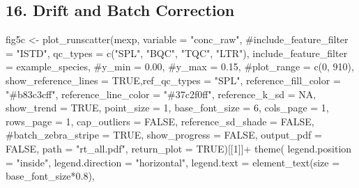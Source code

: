 \documentclass[
  letterpaper,
  DIV=11,
  numbers=noendperiod]{scrartcl}
\newenvironment{Shaded}{\begin{snugshade}}{\end{snugshade}}
\newcommand{\AttributeTok}[1]{\textcolor[rgb]{0.40,0.45,0.13}{#1}}
\newcommand{\CommentTok}[1]{\textcolor[rgb]{0.37,0.37,0.37}{#1}}
\newcommand{\ConstantTok}[1]{\textcolor[rgb]{0.56,0.35,0.01}{#1}}
\newcommand{\DecValTok}[1]{\textcolor[rgb]{0.68,0.00,0.00}{#1}}
\newcommand{\FloatTok}[1]{\textcolor[rgb]{0.68,0.00,0.00}{#1}}
\newcommand{\FunctionTok}[1]{\textcolor[rgb]{0.28,0.35,0.67}{#1}}
\newcommand{\NormalTok}[1]{\textcolor[rgb]{0.00,0.23,0.31}{#1}}
\newcommand{\OtherTok}[1]{\textcolor[rgb]{0.00,0.23,0.31}{#1}}
\newcommand{\SpecialCharTok}[1]{\textcolor[rgb]{0.37,0.37,0.37}{#1}}
\newcommand{\StringTok}[1]{\textcolor[rgb]{0.13,0.47,0.30}{#1}}
\begin{document}
\subsection{16. Drift and Batch
Correction}\label{drift-and-batch-correction-1}

\begin{Shaded}
\begin{Highlighting}[]
\NormalTok{fig5c }\OtherTok{\textless{}{-}} \FunctionTok{plot\_runscatter}\NormalTok{(mexp, }\AttributeTok{variable =} \StringTok{"conc\_raw"}\NormalTok{, }
                \CommentTok{\#include\_feature\_filter = "ISTD", }
                \AttributeTok{qc\_types =} \FunctionTok{c}\NormalTok{(}\StringTok{"SPL"}\NormalTok{, }\StringTok{"BQC"}\NormalTok{, }\StringTok{"TQC"}\NormalTok{, }\StringTok{"LTR"}\NormalTok{), }
                \AttributeTok{include\_feature\_filter =}\NormalTok{ example\_species,}
                \CommentTok{\#y\_min = 0.00,}
                \CommentTok{\#y\_max = 0.15,}
                \CommentTok{\#plot\_range = c(0, 910), }
                \AttributeTok{show\_reference\_lines =} \ConstantTok{TRUE}\NormalTok{,}\AttributeTok{ref\_qc\_types =} \StringTok{"SPL"}\NormalTok{,}
                \AttributeTok{reference\_fill\_color =} \StringTok{"\#b83c3cff"}\NormalTok{,}
                \AttributeTok{reference\_line\_color =} \StringTok{"\#37c2f0ff"}\NormalTok{,}
                \AttributeTok{reference\_k\_sd =} \ConstantTok{NA}\NormalTok{,}
                \AttributeTok{show\_trend =} \ConstantTok{TRUE}\NormalTok{,}
                \AttributeTok{point\_size =} \DecValTok{1}\NormalTok{,}
                \AttributeTok{base\_font\_size =} \DecValTok{6}\NormalTok{,}
                \AttributeTok{cols\_page =} \DecValTok{1}\NormalTok{,}
                \AttributeTok{rows\_page =} \DecValTok{1}\NormalTok{,}
                \AttributeTok{cap\_outliers =} \ConstantTok{FALSE}\NormalTok{,}
                \AttributeTok{reference\_sd\_shade =} \ConstantTok{FALSE}\NormalTok{,}
                \CommentTok{\#batch\_zebra\_stripe = TRUE, }
                \AttributeTok{show\_progress =} \ConstantTok{FALSE}\NormalTok{,}
                \AttributeTok{output\_pdf =} \ConstantTok{FALSE}\NormalTok{,}
                \AttributeTok{path =} \StringTok{"rt\_all.pdf"}\NormalTok{, }\AttributeTok{return\_plot =} \ConstantTok{TRUE}\NormalTok{)[[}\DecValTok{1}\NormalTok{]]}\SpecialCharTok{+}
  \FunctionTok{theme}\NormalTok{(}
    \AttributeTok{legend.position =} \StringTok{"inside"}\NormalTok{,}
    \AttributeTok{legend.direction =} \StringTok{"horizontal"}\NormalTok{, }
    \AttributeTok{legend.text =} \FunctionTok{element\_text}\NormalTok{(}\AttributeTok{size =}\NormalTok{ base\_font\_size}\SpecialCharTok{*}\FloatTok{0.8}\NormalTok{), }

\end{Highlighting}
\end{Shaded}
\end{document}
